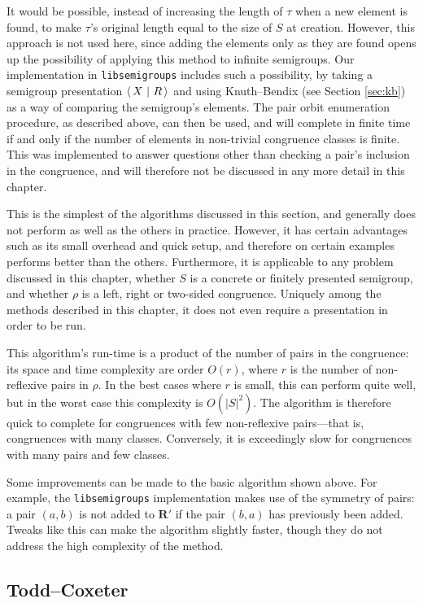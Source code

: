It would be possible, instead of increasing the length of $\tau$ when a new
element is found, to make $\tau$'s original length equal to the size of $S$ at
creation.  However, this approach is not used here, since adding the elements only as
they are found opens up the possibility of applying this method to infinite
semigroups.  Our implementation in \texttt{libsemigroups} \cite{libsemigroups}
includes such a possibility, by taking a semigroup presentation $\left\langle\,X ~\middle|~ R\,\right\rangle$ and
using Knuth--Bendix (see Section \ref{sec:kb}) as a way of comparing the semigroup's
elements.  The pair orbit enumeration procedure, as described above, can then be
used, and will complete in finite time if and only if the number of elements in
non-trivial congruence classes is finite.  This was implemented to answer
questions other than checking a pair's inclusion in the congruence, and will
therefore not be discussed in any more detail in this chapter.

This is the simplest of the algorithms discussed in this section, and generally
does not perform as well as the others in practice.  However, it has certain
advantages such as its small overhead and quick setup, and therefore on certain
examples performs better than the others.  Furthermore, it is applicable to any
problem discussed in this chapter, whether $S$ is a concrete or finitely
presented semigroup, and whether $\rho$ is a left, right or two-sided
congruence.  Uniquely among the methods described in this chapter, it does not
even require a presentation in order to be run.

This algorithm's run-time is a product of the number of pairs in the congruence:
its space and time complexity are order $O(r)$, where $r$ is the number of
non-reflexive pairs in $\rho$.  In the best cases where $r$ is small, this can
perform quite well, but in the worst case this complexity is $O(|S|^2)$.
The algorithm is therefore quick to complete for congruences with few
non-reflexive pairs---that is, congruences with many classes.  Conversely, it is
exceedingly slow for congruences with many pairs and few classes.

Some improvements can be made to the basic algorithm shown above.  For example,
the \texttt{libsemigroups} implementation makes use of the symmetry of pairs: a
pair $(a,b)$ is not added to $\mathbf{R}'$ if the pair $(b,a)$ has previously
been added.  Tweaks like this can make the algorithm slightly faster, though
they do not address the high complexity of the method.

\subsection{Todd--Coxeter}
\label{sec:tc}

